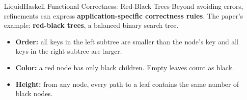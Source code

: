 \documentclass[aspectratio=169]{beamer}
\begin{document}
\begin{frame}{LiquidHaskell Functional Correctness: Red-Black Trees}
	Beyond avoiding errors, refinements can express \textbf{application-specific correctness rules}. The paper's example: \textbf{red-black trees}, a balanced binary search tree.

	\begin{itemize}
		\item \textbf{Order:} all keys in the left subtree are smaller than the node's key and all keys in the right subtree are larger.
		\item \textbf{Color:} a red node has only black children. Empty leaves count as black.
		\item \textbf{Height:} from any node, every path to a leaf contains the same number of black nodes.
	\end{itemize}
\end{frame}
\end{document}

